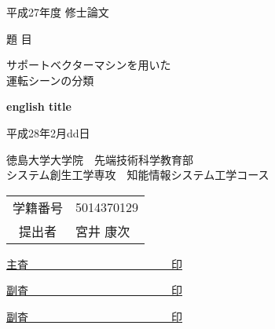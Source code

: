 \documentclass[12pt,twoside]{jreport}  %
\begin{document}
\begin{titlepage}
\begin{center}
\Large

平成27年度 修士論文\\
\vspace*{3zh}

題 目 \\

\vspace*{3zh}

{\Huge
  サポートベクターマシンを用いた\\運転シーンの分類\\
}

\vspace*{2zh}

{\Large\bf
  english title\\
}

\normalsize
\vspace*{2zh}

平成28年2月dd日\\

\vspace*{2zh}


徳島大学大学院　先端技術科学教育部\\
システム創生工学専攻　知能情報システム工学コース\\

\vspace*{3zh}

\begin{table} [h!]
  \centering
  \begin{tabular} {cl}
      学籍番号 & 5014370129\\
      提出者 & 宮井 康次
  \end{tabular}
\end{table}

\Large
\vspace*{3zh}

\underline{主査　　　　　　　　　　　　　{\normalsize 印}}

\vspace*{1zh}

\underline{副査　　　　　　　　　　　　　{\normalsize 印}}

\vspace*{1zh}

\underline{副査　　　　　　　　　　　　　{\normalsize 印}}

\vspace*{5mm}
\end{center}
\end{titlepage}
\end{document}
